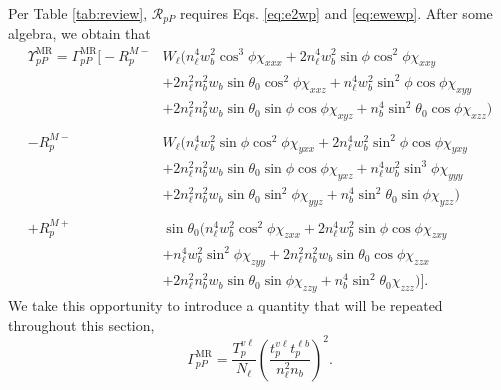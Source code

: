 Per Table \ref{tab:review}, $\mathcal{R}_{pP}$ requires Eqs. \eqref{eq:e2wp}
and \eqref{eq:ewewp}. After some algebra, we obtain that
\begin{equation}\label{eq:rppfullmult}
\begin{split}
\Upsilon^{\mathrm{MR}}_{pP} =
\Gamma^{\mathrm{MR}}_{pP}
\bigg[
- R^{M-}_{p}&W_{\ell}\big(
   n^{4}_{\ell}w^{2}_{b}\cos^{3}\phi\chi_{xxx}
 + 2n^{4}_{\ell}w^{2}_{b}\sin\phi\cos^{2}\phi\chi_{xxy}\\
&+ 2n^{2}_{\ell}n^{2}_{b}w_{b}\sin\theta_{0}\cos^{2}\phi\chi_{xxz}
 + n^{4}_{\ell}w^{2}_{b}\sin^{2}\phi\cos\phi\chi_{xyy}\\
&+ 2n^{2}_{\ell}n^{2}_{b}w_{b}\sin\theta_{0}\sin\phi\cos\phi\chi_{xyz}
 + n^{4}_{b}\sin^{2}\theta_{0}\cos\phi\chi_{xzz}
 \big)\\\\
- R^{M-}_{p}&W_{\ell}\big(
  n^{4}_{\ell}w^{2}_{b}\sin\phi\cos^{2}\phi\chi_{yxx}
+ 2n^{4}_{\ell}w^{2}_{b}\sin^{2}\phi\cos\phi\chi_{yxy}\\
&+ 2n^{2}_{\ell}n^{2}_{b}w_{b}\sin\theta_{0}\sin\phi\cos\phi\chi_{yxz}
 + n^{4}_{\ell}w^{2}_{b}\sin^{3}\phi\chi_{yyy}\\
&+ 2n^{2}_{\ell}n^{2}_{b}w_{b}\sin\theta_{0}\sin^{2}\phi\chi_{yyz}
 + n^{4}_{b}\sin^{2}\theta_{0}\sin\phi\chi_{yzz}
 \big)\\\\
+ R^{M+}_{p}&\sin\theta_{0}\big(
  n^{4}_{\ell}w^{2}_{b}\cos^{2}\phi\chi_{zxx}
 + 2n^{4}_{\ell}w^{2}_{b}\sin\phi\cos\phi\chi_{zxy}\\
&+ n^{4}_{\ell}w^{2}_{b}\sin^{2}\phi\chi_{zyy}
 + 2n^{2}_{\ell}n^{2}_{b}w_{b}\sin\theta_{0}\cos\phi\chi_{zzx}\\
&+ 2n^{2}_{\ell}n^{2}_{b}w_{b}\sin\theta_{0}\sin\phi\chi_{zzy}
 + n^{4}_{b}\sin^{2}\theta_{0}\chi_{zzz}
 \big)
\bigg].
\end{split}
\end{equation}
We take this opportunity to introduce a quantity that will be repeated
throughout this section,
\begin{equation}\label{eq:gammamr}
\Gamma^{\mathrm{MR}}_{pP} =
\frac{T^{v\ell}_{p}}{N_{\ell}}
\left(\frac{t^{v\ell}_{p}t^{\ell b}_{p}}
{n^{2}_{\ell}n_{b}}\right)^{2}.
\end{equation}

